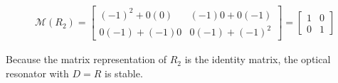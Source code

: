 \documentclass[fleqn]{article}
\begin{document}
\begin{enumerate}[nolistsep]
			\begin{align*}
				\mathcal{M}(R_2) = \begin{bmatrix}(-1)^2 + 0(0) & (-1)0 + 0(-1)\\ 0(-1) + (-1)0 & 0(-1) + (-1)^2\end{bmatrix} = \begin{bmatrix}1 & 0\\ 0 & 1\end{bmatrix}
			\end{align*}
			
			Because the matrix representation of $R_2$ is the identity matrix, the optical resonator with $D=R$ is stable.
			
	\end{enumerate}
\end{document}
